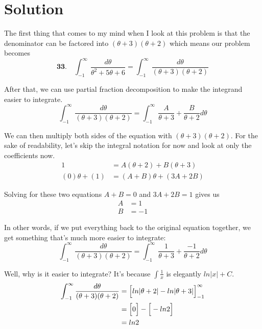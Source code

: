 
\section*{Solution}
The first thing that comes to my mind
when I look at this problem is that
the denominator can be factored into
$ (\theta + 3)(\theta + 2) $ which
means our problem becomes
\begin{equation}
	\textbf{33.}\quad \int_{-1}^{\infty} 
	\frac{d\theta}{\theta^2+5\theta+6}
	=
	\int_{-1}^{\infty} 
	\frac{d\theta}{(\theta + 3)(\theta + 2)}	
\end{equation}

After that, we can use partial fraction decomposition
to make the integrand easier to integrate.
\begin{equation}
	\int_{-1}^{\infty} 
	\frac{d\theta}{(\theta + 3)(\theta + 2)}
	=
	\int_{-1}^{\infty} 
	\frac{A}{\theta + 3} + \frac{B}{\theta + 2} d\theta
\end{equation}

We can then multiply both sides of the
equation with $ (\theta + 3)(\theta + 2) $.
For the sake of readability, let's 
skip the integral notation for now
and look at only the coefficients now.
\begin{align}
	1
	&=
	A(\theta + 2) + B(\theta + 3) \\
	(0)\theta + (1)
	&=
	(A+B)\theta + (3A + 2B)
\end{align}

Solving for these two equations
$ A + B = 0 $ and 
$ 3A + 2B = 1 $ gives us
\begin{align}
	A &= 1 \\
	B &= -1
\end{align}

In other words, if we put everything 
back to the original equation together,
we get something that's much more easier
to integrate: 
\begin{equation*}
	\int_{-1}^{\infty} 
	\frac{d\theta}{(\theta + 3)(\theta + 2)}
	=
	\int_{-1}^{\infty} 
	\frac{1}{\theta + 3} + \frac{-1}{\theta + 2} d\theta
\end{equation*}

\newpage

Well, why is it easier to integrate?
It's because 
$ \int \frac{1}{x} $ is elegantly
$ ln|x| + C $.
\begin{align}
	\int_{-1}^{\infty} 
	\frac{d\theta}{(\theta + 3)(\theta + 2)}
	&=
	\Bigl[
	ln|\theta + 2| - 
	ln|\theta + 3|
	\Bigr]_{-1}^{\infty} \\
	&=
	\Big[
	0
	\Big]
	-
	\Big[
	-ln2
	\Big] \\
	&=
	ln2
\end{align}

